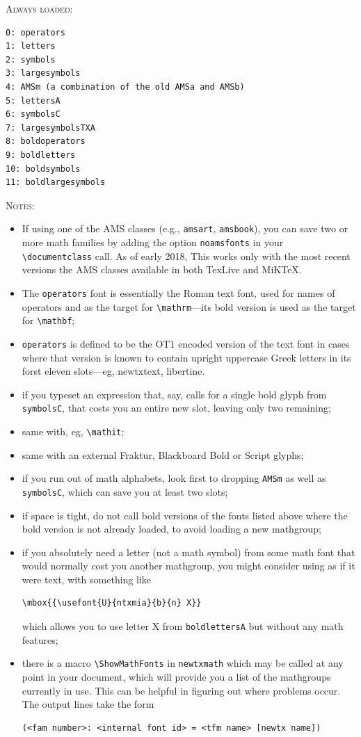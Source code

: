 \documentclass[\fsc]{article}
\theoremstyle{oldplain}
\theoremstyle{plain}
\begin{document}
\textsc{Always loaded:}
\begin{verbatim}
0: operators
1: letters
2: symbols
3: largesymbols
4: AMSm (a combination of the old AMSa and AMSb)
5: lettersA
6: symbolsC
7: largesymbolsTXA
8: boldoperators
9: boldletters
10: boldsymbols
11: boldlargesymbols
\end{verbatim}
\textsc{Notes:}
\begin{itemize}
\item If using one of the AMS classes (e.g., {\tt amsart}, {\tt amsbook}), you can save two or more math families by adding the option {\tt noamsfonts} in your \verb|\documentclass| call. As of early 2018, This works only with the most recent versions the AMS classes available in both TexLive and MiKTeX. 
\item
The {\tt operators} font is essentially the Roman text font, used for names of operators and as the target for \verb|\mathrm|---its bold version is used as the target for \verb|\mathbf|;
\item {\tt operators} is defined to be the OT$1$ encoded version of the text font in cases where that version is known to contain upright uppercase Greek letters in its forst eleven slots---eg, newtxtext, libertine.
\item if you typeset an expression that, say, calls for a single bold glyph from  {\tt symbolsC}, that costs you an entire new slot, leaving only two remaining;
\item same with, eg, \verb|\mathit|;
\item same with an external Fraktur, Blackboard Bold or Script glyphs;
\item if you run out of math alphabets, look first to dropping {\tt AMSm}  as well as {\tt symbolsC}, which can save you at least two slots;
\item if space is tight, do not call bold versions of the fonts listed above where the bold version is not already loaded, to avoid loading a new mathgroup; 
\item if you absolutely need a letter (not a math symbol) from some math font that would normally cost you another mathgroup, you might consider using as if it were text, with something like
\begin{verbatim}
\mbox{{\usefont{U}{ntxmia}{b}{n} X}}
\end{verbatim}
which allows you to use letter X from {\tt boldlettersA} but without any math features;
\item there is a macro \verb|\ShowMathFonts| in {\tt newtxmath} which may be called at any point in your document, which will provide you a list of the mathgroups currently in use. This can be helpful in figuring out where problems occur. The output lines take the form
\begin{verbatim}
(<fam number>: <internal font id> = <tfm name> [newtx name])
\end{verbatim}

\end{itemize}
\end{document}
